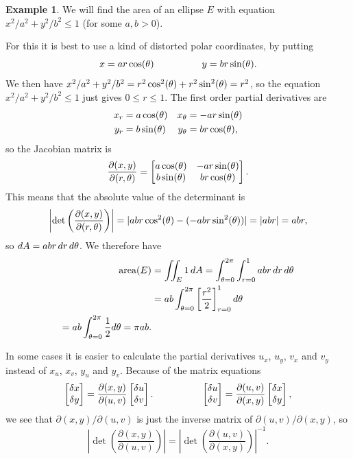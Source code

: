 \documentclass[reqno]{amsart}
\theoremstyle{definition}
\newtheorem{example}[theorem]{Example}
\begin{document}
\begin{example}
 We will find the area of an ellipse $E$ with equation
 $x^2/a^2+y^2/b^2\leq 1$ (for some $a,b>0$).
 \begin{center}
 \end{center}
 For this it is best to use a kind of distorted polar coordinates, by
 putting 
 \[ x = a r \cos(\theta) \hspace{5em} y = b r \sin(\theta). \]
 We then have $x^2/a^2+y^2/b^2=r^2\cos^2(\theta)+r^2\sin^2(\theta)=r^2$,
 so the equation $x^2/a^2+y^2/b^2\leq 1$ just gives $0\leq r\leq 1$.  
 The first order partial derivatives are
 \begin{align*}
  x_r &= a\cos(\theta) & x_\theta &= -ar\sin(\theta) \\
  y_r &= b\sin(\theta) & y_\theta &= br\cos(\theta),
 \end{align*}
 so the Jacobian matrix is
 \[ \frac{\partial(x,y)}{\partial(r,\theta)} = 
     \left[\begin{matrix} a\cos(\theta) & -ar\sin(\theta) \\ b\sin(\theta) & br\cos(\theta) \end{matrix}\right].
 \]
 This means that the absolute value of the determinant is
 \[ \left|\det\left(\frac{\partial(x,y)}{\partial(r,\theta)}\right)\right| = 
     |abr\cos^2(\theta)-(-abr\sin^2(\theta))| = |abr| = abr,
 \]
 so $dA=abr\,dr\,d\theta$.  We therefore have
 \begin{align*}
  \text{area}(E) 
   &= \iint_E 1\,dA 
    = \int_{\azi=0}^{2\pi} \int_{r=0}^1 abr\,dr\,d\azi \\
   &= ab\int_{\azi=0}^{2\pi}\CH{\frac{r^2}{2}}_{r=0}^1 d\azi \\
    = ab\int_{\azi=0}^{2\pi}\frac{1}{2}d\azi = \pi ab.
 \end{align*}
\end{example}

In some cases it is easier to calculate the partial derivatives $u_x$,
$u_y$, $v_x$ and $v_y$ instead of $x_u$, $x_v$, $y_u$ and $y_v$.
Because of the matrix equations 
\[ \left[\begin{matrix} \delta x\\ \delta y\end{matrix}\right] =
    \frac{\partial(x,y)}{\partial(u,v)} \left[\begin{matrix} \delta u\\ \delta v\end{matrix}\right].
     \hspace{5em}
   \left[\begin{matrix} \delta u\\ \delta v\end{matrix}\right] =
    \frac{\partial(u,v)}{\partial(x,y)} \left[\begin{matrix} \delta x\\ \delta y\end{matrix}\right],
\]
we see that $\partial(x,y)/\partial(u,v)$ is just the inverse matrix
of $\partial(u,v)/\partial(x,y)$, so
\[ \left|\det\left(\frac{\partial(x,y)}{\partial(u,v)}\right)\right| = 
   \left|\det\left(\frac{\partial(u,v)}{\partial(x,y)}\right)\right|^{-1}.
\]
\end{document}
